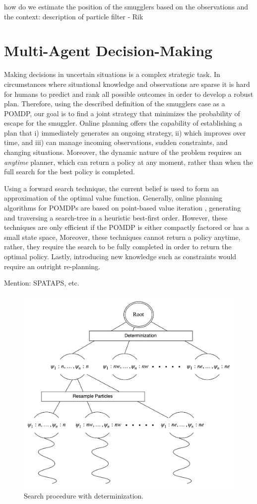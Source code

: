 \documentclass[conference]{IEEEtran}
\begin{document}
{\red how do we estimate the position of the smugglers based on the observations and the context: description of particle filter - Rik}

\section{Multi-Agent Decision-Making}
\label{sec:ma-dec-mak}

Making decisions in uncertain situations is a complex strategic task. In circumstances where situational knowledge and observations are sparse it is hard for humans to predict and rank all possible outcomes in order to develop a robust plan. Therefore, using the described definition of the smugglers case as a POMDP, our goal is to find a joint strategy that minimizes the probability of escape for the smuggler. Online planning offers the capability of establishing a plan that i) immediately generates an ongoing strategy, ii) which improves over time, and iii) can manage incoming observations, sudden constraints, and changing situations. Moreover, the dynamic nature of the problem requires an {\it anytime} planner, which can return a policy at any moment, rather than when the full search for the best policy is completed.

Using a forward search technique, the current belief is used to form an approximation of the optimal value function. Generally, online planning algorithms for POMDPs are based on point-based value iteration \cite{pineau2006anytime,ross2008online}, generating and traversing a search-tree in a heuristic best-first order. However, these techniques are only efficient if the POMDP is either compactly factored or has a small state space, Moreover, these techniques cannot return a policy anytime, rather, they require the search to be fully completed in order to return the optimal policy. Lastly, introducing new knowledge such as constraints would require an outright re-planning.

{\red Mention: SPATAPS, etc.}

\begin{figure}
\begin{center}
 \includegraphics[width=.45\textwidth]{img/searchtree.png}
 \caption{Search procedure with determinization.}\label{fig:searchtree}
\end{center}
\end{figure}
\end{document}
